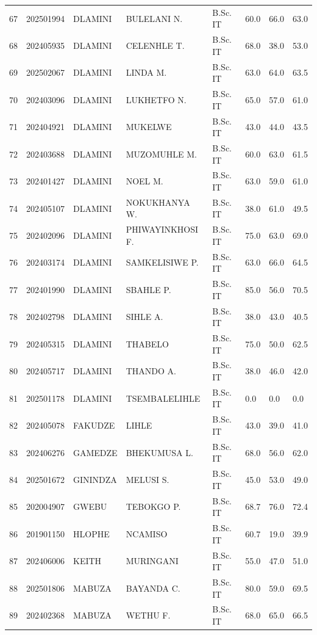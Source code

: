 \documentclass[12pt]{article}
\begin{document}
\begin{longtable}{@{}llllllll@{}}
67 & 202501994 & DLAMINI & BULELANI N. & B.Sc. IT & 60.0 & 66.0 & 63.0 \\
68 & 202405935 & DLAMINI & CELENHLE T. & B.Sc. IT & 68.0 & 38.0 & 53.0 \\
69 & 202502067 & DLAMINI & LINDA M. & B.Sc. IT & 63.0 & 64.0 & 63.5 \\
70 & 202403096 & DLAMINI & LUKHETFO N. & B.Sc. IT & 65.0 & 57.0 & 61.0 \\
71 & 202404921 & DLAMINI & MUKELWE & B.Sc. IT & 43.0 & 44.0 & 43.5 \\
72 & 202403688 & DLAMINI & MUZOMUHLE M. & B.Sc. IT & 60.0 & 63.0 & 61.5 \\
73 & 202401427 & DLAMINI & NOEL M. & B.Sc. IT & 63.0 & 59.0 & 61.0 \\
74 & 202405107 & DLAMINI & NOKUKHANYA W. & B.Sc. IT & 38.0 & 61.0 & 49.5 \\
75 & 202402096 & DLAMINI & PHIWAYINKHOSI F. & B.Sc. IT & 75.0 & 63.0 & 69.0 \\
76 & 202403174 & DLAMINI & SAMKELISIWE P. & B.Sc. IT & 63.0 & 66.0 & 64.5 \\
77 & 202401990 & DLAMINI & SBAHLE P. & B.Sc. IT & 85.0 & 56.0 & 70.5 \\
78 & 202402798 & DLAMINI & SIHLE A. & B.Sc. IT & 38.0 & 43.0 & 40.5 \\
79 & 202405315 & DLAMINI & THABELO & B.Sc. IT & 75.0 & 50.0 & 62.5 \\
80 & 202405717 & DLAMINI & THANDO A. & B.Sc. IT & 38.0 & 46.0 & 42.0 \\
81 & 202501178 & DLAMINI & TSEMBALELIHLE & B.Sc. IT & 0.0 & 0.0 & 0.0 \\
82 & 202405078 & FAKUDZE & LIHLE & B.Sc. IT & 43.0 & 39.0 & 41.0 \\
83 & 202406276 & GAMEDZE & BHEKUMUSA L. & B.Sc. IT & 68.0 & 56.0 & 62.0 \\
84 & 202501672 & GININDZA & MELUSI S. & B.Sc. IT & 45.0 & 53.0 & 49.0 \\
85 & 202004907 & GWEBU & TEBOKGO P. & B.Sc. IT & 68.7 & 76.0 & 72.4 \\
86 & 201901150 & HLOPHE & NCAMISO & B.Sc. IT & 60.7 & 19.0 & 39.9 \\
87 & 202406006 & KEITH & MURINGANI & B.Sc. IT & 55.0 & 47.0 & 51.0 \\
88 & 202501806 & MABUZA & BAYANDA C. & B.Sc. IT & 80.0 & 59.0 & 69.5 \\
89 & 202402368 & MABUZA & WETHU F. & B.Sc. IT & 68.0 & 65.0 & 66.5 \\

\end{longtable}
\end{document}
